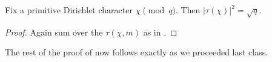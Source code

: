 \documentclass[../notes.tex]{subfiles}
\begin{document}

\begin{lemma}
	Fix a primitive Dirichlet character $\chi\pmod q$. Then $|\tau(\chi)|^2=\sqrt q$.
\end{lemma}
\begin{proof}
	Again sum over the $\tau(\chi,m)$ as in .
\end{proof}
The rest of the proof of  now follows exactly as we proceeded last class.
\end{document}
